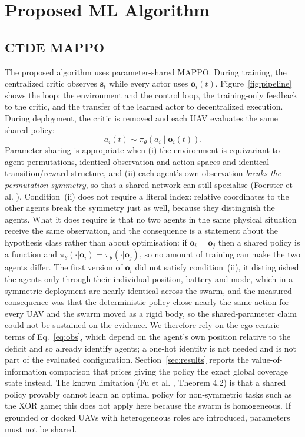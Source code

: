 \documentclass[conference]{IEEEtran}
\begin{document}
\section{Proposed ML Algorithm}
\label{sec:algorithm}

\subsection{CTDE MAPPO}
\label{sec:mappo}
The proposed algorithm uses parameter-shared MAPPO. During training, the centralized critic observes $\mathbf s_t$ while every actor uses $\mathbf o_i(t)$. Figure~\ref{fig:pipeline} shows the loop: the environment and the control loop, the training-only feedback to the critic, and the transfer of the learned actor to decentralized execution. During deployment, the critic is removed and each UAV evaluates the same shared policy:
\begin{equation}
a_i(t)\sim\pi_{\theta}\left(a_i\mid\mathbf o_i(t)\right).
\label{eq:policy}
\end{equation}
Parameter sharing is appropriate when (i) the environment is equivariant to agent permutations, identical observation and action spaces and identical transition/reward structure, and (ii) each agent's own observation \emph{breaks the permutation symmetry}, so that a shared network can still specialise (Foerster et al. \cite{foerster2016}). Condition~(ii) does not require a literal index: relative coordinates to the other agents break the symmetry just as well, because they distinguish the agents. What it does require is that no two agents in the same physical situation receive the same observation, and the consequence is a statement about the hypothesis class rather than about optimisation: if $\mathbf o_i=\mathbf o_j$ then a shared policy is a function and $\pi_\theta(\cdot|\mathbf o_i)=\pi_\theta(\cdot|\mathbf o_j)$, so no amount of training can make the two agents differ. The first version of $\mathbf o_i$ did not satisfy condition~(ii), it distinguished the agents only through their individual position, battery and mode, which in a symmetric deployment are nearly identical across the swarm, and the measured consequence was that the deterministic policy chose nearly the same action for every UAV and the swarm moved as a rigid body, so the shared-parameter claim could not be sustained on the evidence. We therefore rely on the ego-centric terms of Eq.~\eqref{eq:obs}, which depend on the agent's own position relative to the deficit and so already identify agents; a one-hot identity is not needed and is not part of the evaluated configuration.  Section~\ref{sec:results} reports the value-of-information comparison that prices giving the policy the exact global coverage state instead. The known limitation (Fu et al. \cite{fu2022}, Theorem 4.2) is that a shared policy provably cannot learn an optimal policy for non-symmetric tasks such as the XOR game; this does not apply here because the swarm is homogeneous. If grounded or docked UAVs with heterogeneous roles are introduced, parameters must not be shared.
\end{document}
